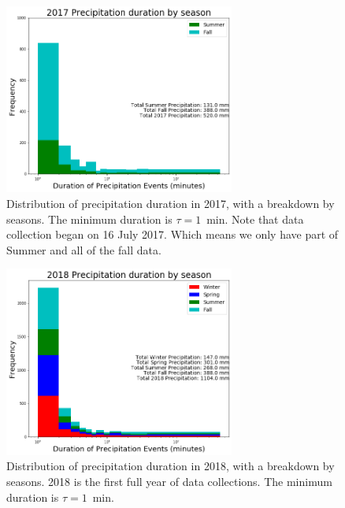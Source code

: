 \documentclass[11pt]{report}
\begin{document}
\clearpage
\begin{figure}[t]
  \centering
  \includegraphics[width=0.675\textwidth]{Figures/precip_2017.png}
  \caption[Precipitation histogram for 2017 broken down by
    season]{\label{p2017} Distribution of precipitation duration in 2017,
    with a breakdown by seasons. The minimum duration is $\tau = 1$~min.
    Note that data collection began on 16 July 2017. Which means we only
    have part of Summer and all of the fall data.  }
\end{figure}
\begin{figure}[b]
  \centering
  \includegraphics[width=0.675\textwidth]{Figures/precip_2018.png}
  \caption[Precipitation histogram for 2018 broken down by
    season]{\label{p2018} Distribution of precipitation duration in 2018,
    with a breakdown by seasons. 2018 is the first full year of data
    collections. The minimum duration is $\tau = 1$~min.}
\end{figure}
\end{document}
